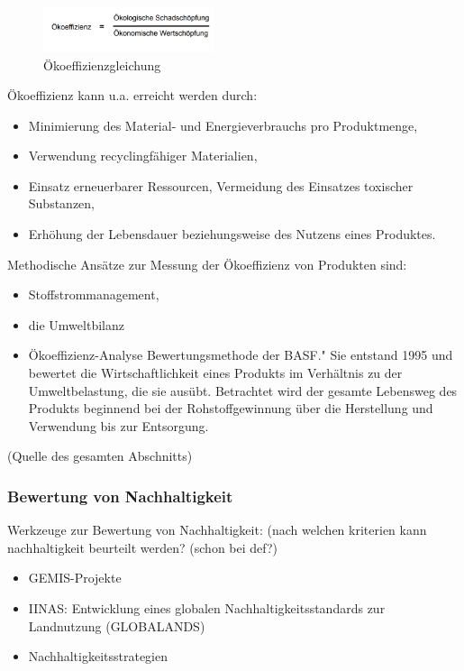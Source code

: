 \documentclass{article}
\begin{document}
\begin{figure}[h]
\centering
\includegraphics[width=5cm]{image_folder/oekoeffizienz.png}
\caption{Ökoeffizienzgleichung}
\label{fig:Ökoeffizienzgleichung}
\end{figure}\cite{Essel2010AnalyseFazit}


Ökoeffizienz kann u.a. erreicht werden durch:
\begin{itemize}
\item Minimierung des Material- und Energieverbrauchs pro Produktmenge,
\item Verwendung recyclingfähiger Materialien,
\item Einsatz erneuerbarer Ressourcen, Vermeidung des Einsatzes toxischer Substanzen,
\item Erhöhung der Lebensdauer beziehungsweise des Nutzens eines Produktes.
\end{itemize}

Methodische Ansätze zur Messung der Ökoeffizienz von Produkten sind:
\begin{itemize}
\item Stoffstrommanagement,
\item die Umweltbilanz
\item Ökoeffizienz-Analyse Bewertungsmethode der BASF." Sie entstand 1995 und bewertet die Wirtschaftlichkeit eines Produkts im Verhältnis zu der Umweltbelastung, die sie ausübt. Betrachtet wird der gesamte Lebensweg des Produkts beginnend bei der Rohstoffgewinnung über die Herstellung und Verwendung bis zur Entsorgung.
\end{itemize}
\cite{DefinitionWirtschaftslexikonc} (Quelle des gesamten Abschnitts)

\subsubsection{Bewertung von Nachhaltigkeit}
Werkzeuge zur Bewertung von Nachhaltigkeit: (nach welchen kriterien kann nachhaltigkeit beurteilt werden? (schon bei def?)

\begin{itemize}
-Analyse Bewertung von Nachhaltigkeit mit der -Analyse und SEEBALANCE®
\item GEMIS-Projekte
\item IINAS: Entwicklung eines globalen Nachhaltigkeitsstandards zur Landnutzung (GLOBALANDS)
\item Nachhaltigkeitsstrategien
\end{itemize}
\end{document}
